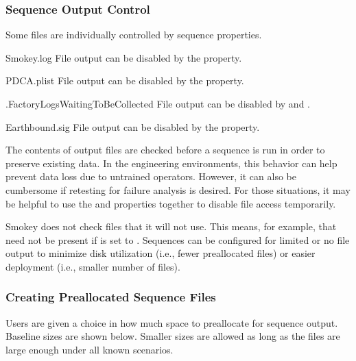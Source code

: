 \subsubsection{Sequence Output Control}

Some files are individually controlled by sequence
properties.

\begin{Descriptive}

	\item[Smokey.log] File output can be disabled by the 
	property.

	\item[PDCA.plist] File output can be disabled by the
	 property.

	\item[.FactoryLogsWaitingToBeCollected] File output can be disabled by
	 and .

	\item[Earthbound.sig] File output can be disabled by the
	 property.

\end{Descriptive}

The contents of output files are checked before a sequence is run in order to
preserve existing data.  In the engineering environments, this behavior can
help prevent data loss due to untrained operators.  However, it can also be
cumbersome if retesting for failure analysis is desired.  For those situations,
it may be helpful to use the  and 
properties together to disable file access temporarily.

Smokey does not check files that it will not use.  This means, for example,
that  need not be present if  is set
to .  Sequences can be configured for limited or no file output
to minimize disk utilization (i.e., fewer preallocated files) or easier
deployment (i.e., smaller number of files).

\subsubsection{Creating Preallocated Sequence Files}

Users are given a choice in how much space to preallocate for sequence output.
Baseline sizes are shown below.  Smaller sizes are allowed as long as the files
are large enough under all known scenarios.

